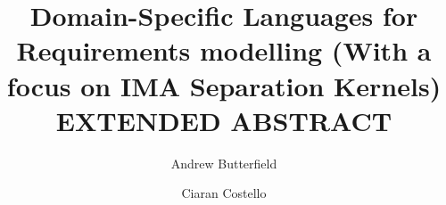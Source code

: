 \documentclass[a4paper, twocolumn]{esapub2005} %
\begin{document}
\title{
  Domain-Specific Languages for Requirements modelling
  \newline
  (With a focus on IMA Separation Kernels)
  \newline
  EXTENDED ABSTRACT
}

\author{Andrew Butterfield}
\author{Ciaran  Costello}


\date{}

\maketitle





\end{document}
